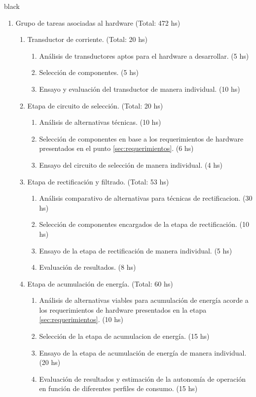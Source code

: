 \documentclass[11pt]{charter}
\begin{document}
\begin{consigna}{black}
\begin{enumerate}
\item Grupo de tareas asociadas al hardware (Total: 472 hs)
	\begin{enumerate}
			 \item Transductor de corriente. (Total: 20 hs)
			 \begin{enumerate}
			 	\item Análisis de transductores aptos para el hardware a desarrollar. (5 hs)
			 	\item Selección de componentes. (5 hs)
			 	\item Ensayo y evaluación del transductor de manera individual. (10 hs)
			 \end{enumerate}
			
			 \item Etapa de circuito de selección. (Total: 20 hs)
			 \begin{enumerate}
			 	\item Análisis de alternativas técnicas. (10 hs)
			 	\item Selección de componentes en base a los requerimientos de hardware presentados en el punto \ref{sec:requerimientos}. (6 hs)
			 	\item Ensayo del circuito de selección de manera individual. (4 hs)
			 \end{enumerate}			
			
			 \item Etapa de rectificación y filtrado. (Total: 53 hs)
			 \begin{enumerate}
				\item Análisis comparativo de alternativas para técnicas de rectificacion. (30 hs)
				\item Selección de componentes encargados de la etapa de rectificación. (10 hs)
				\item Ensayo de la etapa de rectificación de manera individual. (5 hs)
				\item Evaluación de resultados. (8 hs)
			 \end{enumerate}
			
			 \item Etapa de acumulación de energía. (Total: 60 hs)
			 \begin{enumerate}
			 	\item Análisis de alternativas viables para acumulación de energía acorde a los requerimientos de hardware presentados en la etapa \ref{sec:requerimientos}. (10 hs)
			 	\item Selección de la etapa de acumulacion de energía. (15 hs)
			 	\item Ensayo de la etapa de acumulación de energía de manera individual. (20 hs)
			 	\item Evaluación de resultados y estimación de la autonomía de operación en función de diferentes perfiles de consumo. (15 hs)
			 \end{enumerate}
			 

\end{enumerate}
\end{enumerate}
\end{consigna}
\end{document}
